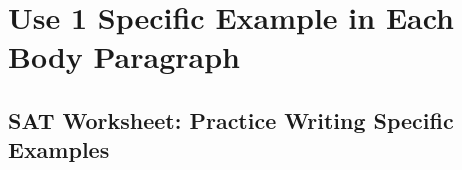 \section{Use 1 Specific Example in Each Body Paragraph}
\subsection{SAT Worksheet: Practice Writing Specific Examples}